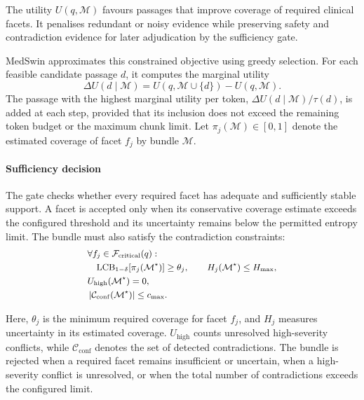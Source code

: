 \documentclass[conference]{IEEEtran}
\begin{document}
The utility \(U(q,\mathcal{M})\) favours passages that improve coverage of required clinical facets. It penalises redundant or noisy evidence while preserving safety and contradiction evidence for later adjudication by the sufficiency gate.

MedSwin approximates this constrained objective using greedy selection. For each feasible candidate passage \(d\), it computes the marginal utility
\[
\Delta U(d\mid\mathcal{M})
=
U(q,\mathcal{M}\cup\{d\})-U(q,\mathcal{M}).
\]
The passage with the highest marginal utility per token,
\(\Delta U(d\mid\mathcal{M})/\tau(d)\), is added at each step, provided that its inclusion does not exceed the remaining token budget or the maximum chunk limit. Let \(\pi_j(\mathcal{M})\in[0,1]\) denote the estimated coverage of facet \(f_j\) by bundle \(\mathcal{M}\).

\paragraph{Sufficiency decision}
The gate checks whether every required facet has adequate and sufficiently stable support. A facet is accepted only when its conservative coverage estimate exceeds the configured threshold and its uncertainty remains below the permitted entropy limit. The bundle must also satisfy the contradiction constraints:
\begin{equation}
\label{eq:sufficiency-gate-main}
\small
\begin{aligned}
&\forall f_j\in\mathcal{F}_{\mathrm{critical}}(q):\\
&\quad
\mathrm{LCB}_{1-\delta}
\!\left[\pi_j(\mathcal{M}^{\star})\right]
\geq \theta_j,
\qquad
H_j(\mathcal{M}^{\star})\leq H_{\max},\\
&U_{\mathrm{high}}(\mathcal{M}^{\star})=0,\\
&\left|
\mathcal{C}_{\mathrm{conf}}(\mathcal{M}^{\star})
\right|
\leq c_{\max}.
\end{aligned}
\end{equation}

Here, \(\theta_j\) is the minimum required coverage for facet \(f_j\), and \(H_j\) measures uncertainty in its estimated coverage. \(U_{\mathrm{high}}\) counts unresolved high-severity conflicts, while \(\mathcal{C}_{\mathrm{conf}}\) denotes the set of detected contradictions. The bundle is rejected when a required facet remains insufficient or uncertain, when a high-severity conflict is unresolved, or when the total number of contradictions exceeds the configured limit.
\end{document}
